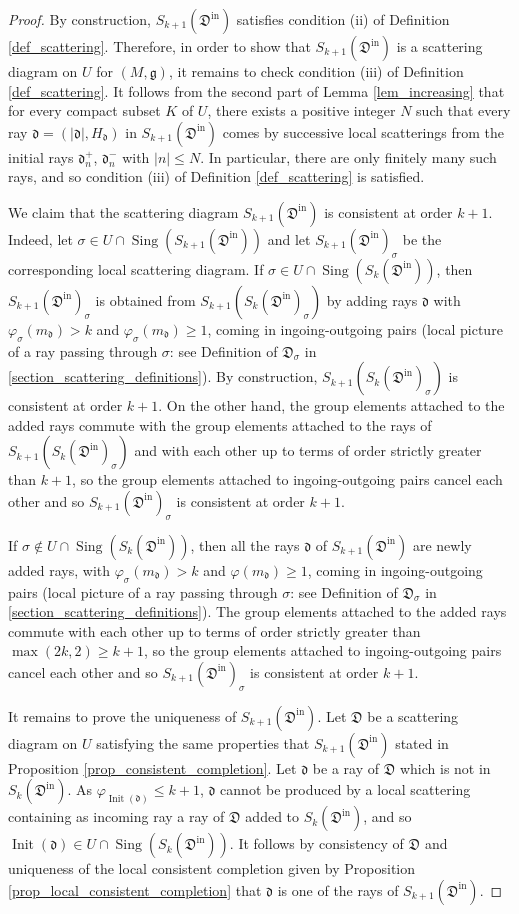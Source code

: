 \documentclass[12pt, a4paper]{amsart}
\newcommand\fd{\mathfrak d}
\newcommand\fD{\mathfrak D}
\newcommand\fg{\mathfrak g}
\newcommand\Sing{\operatorname{Sing}}
\newcommand\Init{\operatorname{Init}}
\newcommand\iin{\mathrm{in}}
\begin{document}
\begin{proof}
By construction, $S_{k+1}(\fD^\iin)$ satisfies condition (ii) of Definition 
\ref{def_scattering}. Therefore, in order to show that $S_{k+1}(\fD^\iin)$ is a scattering diagram on $U$ for $(M,\fg)$, 
it remains to check condition (iii) of Definition 
\ref{def_scattering}. It follows from the second part of Lemma 
\ref{lem_increasing} that for every compact 
subset $K$ of $U$, there exists 
a positive integer $N$ such that every ray 
$\fd =(|\fd|,H_\fd)$ in 
$S_{k+1}(\fD^\iin)$
comes by successive local scatterings from the initial rays $\fd_n^+$, $\fd_n^-$ with 
$|n| \leqslant N$. In particular, there are only finitely many such rays, and so condition (iii) of Definition \ref{def_scattering} is satisfied.

We claim that the scattering diagram $S_{k+1}(\fD^{\iin})$ is consistent at order $k+1$.
Indeed, let $\sigma \in U \cap \Sing(S_{k+1}(\fD^\iin))$ and let $S_{k+1}(\fD^{\iin})_\sigma$ be the corresponding local scattering diagram. 
If $\sigma \in U \cap 
\Sing (S_k(\fD^\iin))$, then $S_{k+1}(\fD^{\iin})_\sigma$ is obtained from $S_{k+1}(S_k(\fD^\iin)_\sigma)$ 
by adding rays $\fd$ with $\varphi_\sigma(m_\fd) >k$ and
$\varphi_\sigma(m_\fd) \geqslant 1$, coming in ingoing-outgoing pairs (local picture of a ray passing through $\sigma$: see Definition of 
$\fD_\sigma$ in \cref{section_scattering_definitions}).
By construction, $S_{k+1}(S_k(\fD^\iin)_\sigma)$
is consistent at order $k+1$. On the other hand, the group elements attached to the added rays commute with the group elements attached to the rays of $S_{k+1}(S_k(\fD^\iin)_\sigma)$
and with each other up to terms of order strictly greater than $k+1$, 
so the group elements attached to ingoing-outgoing pairs cancel each other and so 
$S_{k+1}(\fD^{\iin})_\sigma$ is consistent at order $k+1$. 

If $\sigma \notin U \cap 
\Sing (S_k(\fD^\iin))$, then all the rays 
$\fd$ of $S_{k+1}(\fD^\iin)$ are newly added rays, with $\varphi_\sigma(m_\fd) >k$
and $\varphi(m_\fd) \geqslant 1$, coming in ingoing-outgoing pairs (local picture of a ray passing through $\sigma$: see Definition of 
$\fD_\sigma$ in \cref{section_scattering_definitions}). The group elements attached to the added rays commute with each other up to terms of order strictly greater than $
\max(2k,2) \geqslant k+1$, so the group elements attached to ingoing-outgoing pairs cancel each other and so
$S_{k+1}(\fD^{\iin})_\sigma$ is consistent at order $k+1$.

It remains to prove the uniqueness of
$S_{k+1}(\fD^\iin)$.
Let $\fD$ be a scattering diagram on 
$U$ satisfying the same properties that 
$S_{k+1}(\fD^\iin)$ stated in Proposition
\ref{prop_consistent_completion}.
Let $\fd$ be a ray of $\fD$ which is not in $S_k(\fD^\iin)$. As $\varphi_{\Init(\fd)}
\leqslant k+1$, $\fd$ cannot be produced by a local scattering containing as incoming ray a ray of $\fD$ added to 
$S_k(\fD^\iin)$, and so $\Init(\fd)
\in U \cap \Sing(S_k(\fD^\iin))$.
It follows by consistency of 
$\fD$ and uniqueness of the local consistent completion given by Proposition 
\ref{prop_local_consistent_completion} that 
$\fd$ is one of the rays of 
$S_{k+1}(\fD^\iin)$.
\end{proof}
\end{document}
